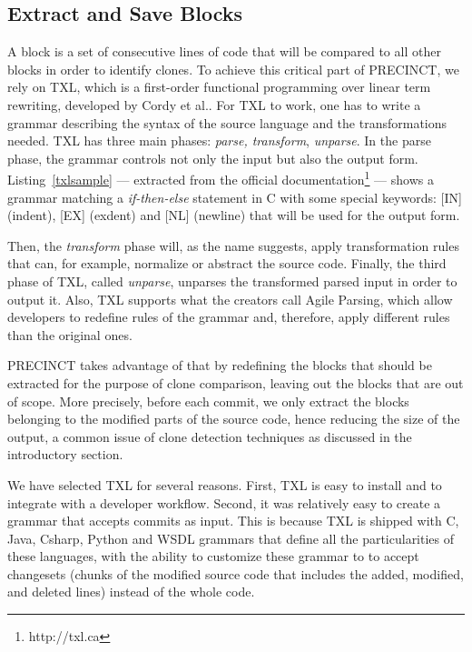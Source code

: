 \documentclass[conference]{IEEEtran}
\begin{document}
\subsection{Extract and Save Blocks}
\label{sub:Extract and Save Blocks}

A block is a set of consecutive lines of code that will be compared to all other blocks in order to identify clones.
To achieve this critical part of PRECINCT, we rely on TXL\cite{Cordy2006a}, which is a first-order functional programming over linear term rewriting, developed by Cordy et al.\cite{Cordy2006a}. For TXL to work, one has to write a grammar describing the syntax of the source  language and the transformations needed. TXL has three main phases: \textit{parse, transform}, \textit{unparse}. In the parse phase, the grammar controls not only the input but also the output form. Listing~\ref{txlsample} --- extracted from the official documentation\footnote{http://txl.ca} --- shows a grammar matching a \textit{if-then-else} statement in C with some special keywords: [IN] (indent), [EX] (exdent) and [NL] (newline) that will be used for the output form.

\noindent\begin{minipage}{0.90\linewidth}

  

\end{minipage}

Then, the \textit{transform} phase will, as the name suggests, apply transformation rules that can, for example, normalize or abstract the source code. Finally, the third phase of TXL,  called \textit{unparse}, unparses the transformed parsed input in order to output it. Also, TXL supports what the creators call Agile Parsing\cite{Dean}, which allow developers to redefine rules of the grammar and, therefore, apply different rules than the original ones.


PRECINCT takes advantage of that by redefining the blocks that should be extracted for the purpose of clone comparison, leaving out the  blocks that are out of scope.  More precisely, before each commit, we only extract the blocks belonging to the modified parts of the source code, hence reducing the size of the output, a common issue of clone detection techniques as discussed in the introductory section. 

We have selected TXL for several reasons. First, TXL is easy to install and to integrate with a developer workflow. Second, it was relatively easy to create a grammar that accepts commits as input. This is because TXL is shipped with C, Java, Csharp, Python and WSDL grammars that define all the particularities of these languages, with the ability to customize these grammar to to accept changesets (chunks of the modified source code that includes the added, modified, and deleted lines) instead of the whole code.
\end{document}
